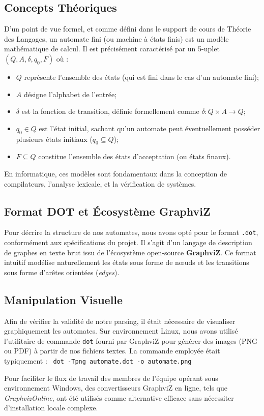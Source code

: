 \documentclass[12pt,a4paper]{article}
\begin{document}
\subsection{Concepts Théoriques}
D'un point de vue formel, et comme défini dans le support de cours de Théorie des Langages, un automate fini (ou machine à états finis) est un modèle mathématique de calcul. Il est précisément caractérisé par un 5-uplet $(Q, A, \delta, q_0, F)$ où :
\begin{itemize}
\item $Q$ représente l'ensemble des états (qui est fini dans le cas d'un automate fini);
\item $A$ désigne l'alphabet de l'entrée;
\item $\delta$ est la fonction de transition, définie formellement comme $\delta: Q \times A \rightarrow Q$;
\item $q_0 \in Q$ est l'état initial, sachant qu'un automate peut éventuellement posséder plusieurs états initiaux ($q_0 \subseteq Q$);
\item $F \subseteq Q$ constitue l'ensemble des états d'acceptation (ou états finaux).
\end{itemize}
En informatique, ces modèles sont fondamentaux dans la conception de compilateurs, l'analyse lexicale, et la vérification de systèmes.
\subsection{Format DOT et Écosystème GraphviZ}
Pour décrire la structure de nos automates, nous avons opté pour le format \texttt{.dot}, conformément aux spécifications du projet. Il s'agit d'un langage de description de graphes en texte brut issu de l'écosystème open-source \textbf{GraphviZ}. Ce format intuitif modélise naturellement les états sous forme de nœuds et les transitions sous forme d'arêtes orientées (\textit{edges}).

\subsection{Manipulation Visuelle}
Afin de vérifier la validité de notre parsing, il était nécessaire de visualiser graphiquement les automates. Sur environnement Linux, nous avons utilisé l'utilitaire de commande \texttt{dot} fourni par GraphviZ pour générer des images (PNG ou PDF) à partir de nos fichiers textes. La commande employée était typiquement : \
\texttt{dot -Tpng automate.dot -o automate.png}

Pour faciliter le flux de travail des membres de l'équipe opérant sous environnement Windows, des convertisseurs GraphviZ en ligne, tels que \textit{GraphvizOnline}, ont été utilisés comme alternative efficace sans nécessiter d'installation locale complexe.
\end{document}
